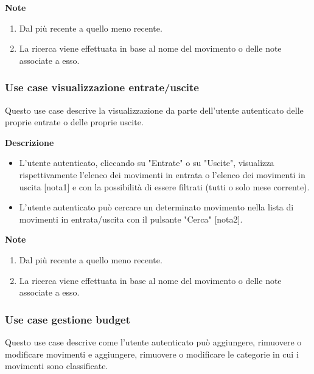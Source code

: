 \documentclass[a4paper,12pt]{article}
\begin{document}
\textbf{Note}
\begin{enumerate} \setlength\itemsep{0.01em}
\item Dal più recente a quello meno recente.
\item La ricerca viene effettuata in base al nome del movimento o delle note associate a esso.
\end{enumerate}



\subsubsection*{Use case visualizzazione entrate/uscite}

Questo use case descrive la visualizzazione da parte dell'utente autenticato delle proprie entrate o delle proprie uscite.

\textbf{Descrizione}
\begin{itemize} \setlength\itemsep{0.01em}
\item L'utente autenticato, cliccando su "Entrate" o su "Uscite", visualizza rispettivamente l'elenco dei movimenti in entrata o l'elenco dei movimenti in uscita [nota1] e con la possibilità di essere filtrati (tutti o solo mese corrente).
\item L'utente autenticato può cercare un determinato movimento nella lista di movimenti in entrata/uscita con il pulsante "Cerca" [nota2].
\end{itemize}

\textbf{Note}
\begin{enumerate} \setlength\itemsep{0.01em}
\item Dal più recente a quello meno recente.
\item La ricerca viene effettuata in base al nome del movimento o delle note associate a esso.
\end{enumerate}




\subsubsection*{Use case gestione budget}

Questo use case descrive come l'utente autenticato può aggiungere, rimuovere o modificare movimenti e aggiungere, rimuovere o modificare le categorie in cui i movimenti sono classificate.
\end{document}
